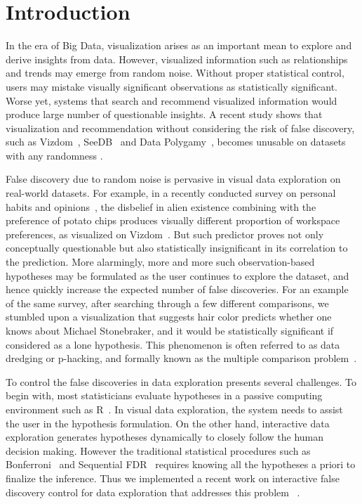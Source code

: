 \section{Introduction}
\label{sec:intro}
 In the era of Big Data, visualization arises as an important mean to explore and derive insights from data.  However, visualized information such as relationships and trends may emerge from random noise.  Without proper statistical control, users may mistake visually significant observations as statistically significant.  Worse yet, systems that search and recommend visualized information would produce large number of questionable insights.  
A recent study shows that visualization and recommendation without considering the risk of false discovery, such as Vizdom~\cite{vizdom}, SeeDB~\cite{seedb} and Data Polygamy~\cite{polygamy}, becomes unusable on datasets with any randomness \cite{towards-sustainable-insight}.

 False discovery due to random noise is pervasive in visual data exploration on real-world datasets. For example, in a recently conducted survey on personal habits and opinions~\cite{towards-sustainable-insight}, the disbelief in alien existence combining with the preference of potato chips produces visually different proportion of workspace preferences, as visualized on Vizdom~\cite{vizdom}.  But such predictor proves not only conceptually questionable but also statistically insignificant in its correlation to the prediction.  More alarmingly, more and more such observation-based hypotheses may be formulated as the user continues to explore the dataset, and hence quickly increase the expected number of false discoveries. For an example of the same survey, after searching through a few different comparisons, we stumbled upon a visualization that suggests hair color predicts whether one knows about Michael Stonebraker, and it would be statistically significant if considered as a lone hypothesis. This phenomenon is often referred to as data dredging or p-hacking, and formally known as the multiple comparison problem~\cite{shaffer1995multiple}.

To control the false discoveries in data exploration presents several challenges.  To begin with, most statisticians evaluate hypotheses in a passive computing environment such as R~\cite{R}. In visual data exploration, the system needs to assist the user in the hypothesis formulation.  On the other hand, interactive data exploration generates hypotheses dynamically to closely follow the human decision making.  However the traditional statistical procedures such as Bonferroni~\cite{bonferroni1936teoria} and Sequential FDR~\cite{seq-fdr} requires knowing all the hypotheses a priori to finalize the inference.  Thus we implemented a recent work on interactive false discovery control for data exploration that addresses this problem ~\cite{controlling-false-discoveries}.  

